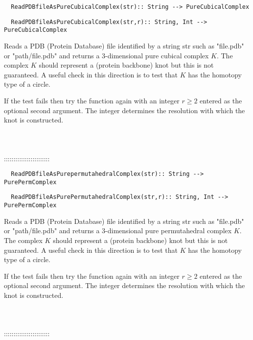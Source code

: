 \documentclass[a4paper,11pt]{report}
\begin{document}
{\begin{verbatim}  ReadPDBfileAsPureCubicalComplex(str):: String --> PureCubicalComplex
\end{verbatim}
 
\begin{verbatim}  ReadPDBfileAsPureCubicalComplex(str,r):: String, Int --> PureCubicalComplex
\end{verbatim}


 

 Reads a PDB (Protein Database) file identified by a string str such as
"file.pdb" or "path/file.pdb" and returns a $3$-dimensional pure cubical complex $K$. The complex $K$ should represent a (protein backbone) knot but this is not guaranteed. A
useful check in this direction is to test that $K$ has the homotopy type of a circle. 

If the test fails then try the function again with an integer $r \ge 2$ entered as the optional second argument. The integer determines the resolution
with which the knot is constructed. \\
 \\
 \\
 \\
 ::::::::::::::::::::::::\\
 
\begin{verbatim}  ReadPDBfileAsPurepermutahedralComplex(str):: String --> PurePermComplex
\end{verbatim}
 
\begin{verbatim}  ReadPDBfileAsPurePermutahedralComplex(str,r):: String, Int --> PurePermComplex
\end{verbatim}


 

 Reads a PDB (Protein Database) file identified by a string str such as
"file.pdb" or "path/file.pdb" and returns a $3$-dimensional pure permutahedral complex $K$. The complex $K$ should represent a (protein backbone) knot but this is not guaranteed. A
useful check in this direction is to test that $K$ has the homotopy type of a circle. 

If the test fails then try the function again with an integer $r \ge 2$ entered as the optional second argument. The integer determines the resolution
with which the knot is constructed. \\
 \\
 \\
 \\
 ::::::::::::::::::::::::\\
 
}
\end{document}
